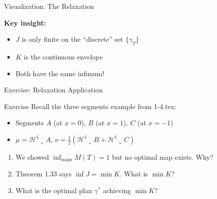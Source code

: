 \documentclass[aspectratio=169]{beamer}
\newcommand{\Hone}{\mathcal{H}^1}
\begin{document}
\begin{frame}{Visualization: The Relaxation}
\begin{center}
\end{center}

\textbf{Key insight:}
\begin{itemize}
    \item $J$ is only finite on the ``discrete'' set $\{\gamma_T\}$
    \item $K$ is the continuous envelope
    \item Both have the same infimum!
\end{itemize}
\end{frame}

\begin{frame}{Exercise: Relaxation Application}
\begin{block}{Exercise}
Recall the three segments example from 1-4.tex:
\begin{itemize}
    \item Segments $A$ (at $x=0$), $B$ (at $x=1$), $C$ (at $x=-1$)
    \item $\mu = \Hone \llcorner A$, $\nu = \frac{1}{2}(\Hone \llcorner B + \Hone \llcorner C)$
\end{itemize}
\begin{enumerate}
    \item[(a)] We showed $\inf_{\text{maps}} M(T) = 1$ but no optimal map exists. Why?
    \item[(b)] Theorem 1.33 says $\inf J = \min K$. What is $\min K$?
    \item[(c)] What is the optimal plan $\gamma^*$ achieving $\min K$?
\end{enumerate}
\end{block}
\end{frame}
\end{document}
